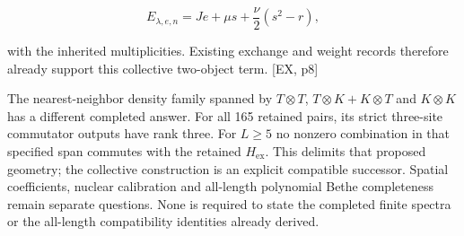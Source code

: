 \[
E_{\lambda,e,n}=Je+\mu s+\frac\nu2(s^2-r),
\]

with the inherited multiplicities. Existing exchange and weight records therefore already support this collective two-object term. {[}EX, p8{]}

The nearest-neighbor density family spanned by \(T\otimes T\), \(T\otimes K+K\otimes T\) and \(K\otimes K\) has a different completed answer. For all 165 retained pairs, its strict three-site commutator outputs have rank three. For \(L\ge5\) no nonzero combination in that specified span commutes with the retained \(H_{\mathrm{ex}}\). This delimits that proposed geometry; the collective construction is an explicit compatible successor. Spatial coefficients, nuclear calibration and all-length polynomial Bethe completeness remain separate questions. None is required to state the completed finite spectra or the all-length compatibility identities already derived.
